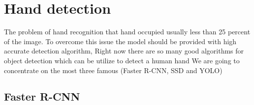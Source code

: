 \documentclass[12pt]{report}
\begin{document}
\section{Hand detection}

The problem of hand recognition that hand occupied usually less than 25 percent of the image.
To overcome this issue the model should be provided with high accurate detection algorithm,
Right now there are so many good algorithms for object detection which can be utilize to 
detect a human hand We are going to concentrate on the most three famous (Faster R-CNN, SSD and YOLO)

\subsection{Faster R-CNN}
\end{document}
